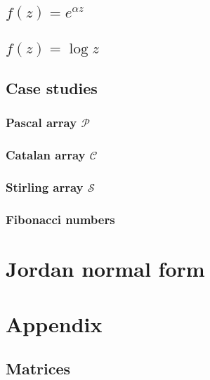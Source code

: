 

\subsection{$f(z)=e^{\alpha z}$}



\subsection{$f(z)=\log{z}$}



\subsection{Case studies}

\subsubsection{Pascal array $\mathcal{P}$}



\subsubsection{Catalan array $\mathcal{C}$}



\subsubsection{Stirling array $\mathcal{S}$}



\subsubsection{Fibonacci numbers}



\section{Jordan normal form}



\section{Appendix}




\subsection*{Matrices}





